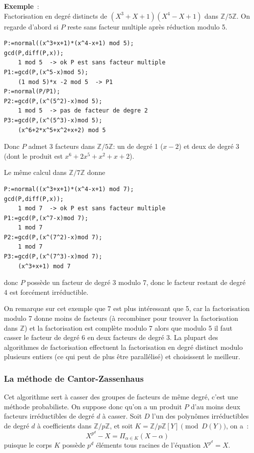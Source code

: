 \documentclass[a4paper,11pt]{article}
\newcommand{\Z}{{\mathbb{Z}}}
\begin{document}
{\bf Exemple}~:\\
Factorisation en degré distincts de $(X^3+X+1)(X^4-X+1)$ dans
$\Z/5\Z$. On regarde d'abord si $P$ reste sans facteur multiple après
réduction modulo 5.
\begin{verbatim}
P:=normal((x^3+x+1)*(x^4-x+1) mod 5);
gcd(P,diff(P,x));
    1 mod 5  -> ok P est sans facteur multiple
P1:=gcd(P,(x^5-x)mod 5);
    (1 mod 5)*x -2 mod 5  -> P1
P:=normal(P/P1);
P2:=gcd(P,(x^(5^2)-x)mod 5);
    1 mod 5  -> pas de facteur de degre 2
P3:=gcd(P,(x^(5^3)-x)mod 5);
    (x^6+2*x^5+x^2+x+2) mod 5
\end{verbatim}
Donc $P$ admet 3 facteurs dans $\Z/5\Z$: un de degré 1 ($x-2$) et
deux de degré 3 (dont le produit est $x^6+2x^5+x^2+x+2$).

Le même calcul dans $\Z/7\Z$ donne
\begin{verbatim}
P:=normal((x^3+x+1)*(x^4-x+1) mod 7);
gcd(P,diff(P,x));
    1 mod 7  -> ok P est sans facteur multiple
P1:=gcd(P,(x^7-x)mod 7);
    1 mod 7
P2:=gcd(P,(x^(7^2)-x)mod 7);
    1 mod 7
P3:=gcd(P,(x^(7^3)-x)mod 7);
    (x^3+x+1) mod 7
\end{verbatim}
donc $P$ possède un facteur de degré 3 modulo 7, donc le facteur restant
de degré 4 est forcément irréductible.

On remarque sur cet exemple que 7 est plus intéressant que 5, car
la factorisation modulo 7 donne moins de facteurs (à recombiner pour
trouver la factorisation dans $\Z$) et la factorisation est
complète modulo 7 alors que modulo 5 il faut casser le facteur de
degré 6 en deux facteurs de degré 3. La plupart des algorithmes
de factorisation effectuent la factorisation en degré distinct
modulo plusieurs entiers (ce qui peut de plus être parallélisé)
et choisissent le meilleur.

\subsubsection{La méthode de Cantor-Zassenhaus}
Cet algorithme sert à casser des groupes de facteurs de même degré,
c'est une méthode probabiliste. On suppose donc qu'on a un produit $P$
d'au moins deux facteurs irréductibles de degré $d$ à casser.
Soit $D$ l'un des polynômes irréductibles de degré $d$ à coefficients
dans $\Z/p\Z$, et soit $K=\Z/p\Z[Y] \pmod {D(Y)}$, on a~:
\[X^{p^d}-X=\Pi_{\alpha \in K }(X-\alpha) \]
puisque le corps $K$ possède $p^d$ éléments tous racines
de l'équation $X^{p^d}=X$.
\end{document}
